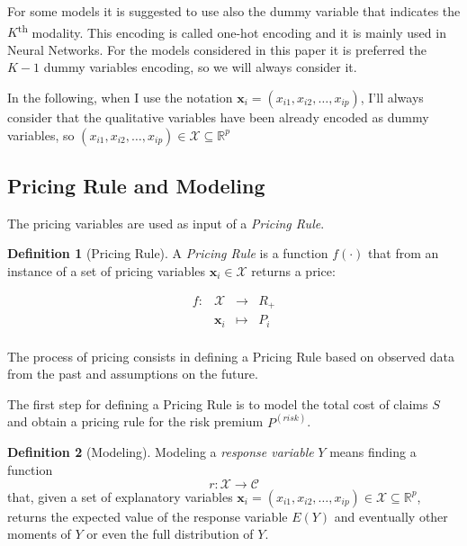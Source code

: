 \documentclass[a4paper, nobind]{templates/ociamthesis}
\theoremstyle{definition}
\newtheorem{definition}{Definition}[chapter]
\theoremstyle{definition}
\theoremstyle{definition}
\theoremstyle{remark}
\begin{document}
For some models it is suggested to use also the dummy variable that indicates the \(K\)\textsuperscript{th} modality. This encoding is called one-hot encoding and it is mainly used in Neural Networks. For the models considered in this paper it is preferred the \(K-1\) dummy variables encoding, so we will always consider it.

In the following, when I use the notation \(\boldsymbol{x}_i=(x_{i1}, x_{i2}, \dots, x_{ip})\), I'll always consider that the qualitative variables have been already encoded as dummy variables, so \((x_{i1}, x_{i2}, \dots, x_{ip})\in \mathcal{X} \subseteq \mathbb{R}^p\)

\hypertarget{pricing-rule-and-modeling}{%
\subsection{Pricing Rule and Modeling}\label{pricing-rule-and-modeling}}

The pricing variables are used as input of a \emph{Pricing Rule}.

\begin{definition}[Pricing Rule]
\label{def:pricing-rule} \iffalse (Pricing Rule) \fi{} A \emph{Pricing Rule} is a function \(f(\cdot)\) that from an instance of a set of pricing variables \(\boldsymbol{x}_i\in\mathcal{X}\) returns a price:

\[  
\begin{array}{rccl}
f: & \mathcal{X}      & \longrightarrow  & R_+ \\
   & \boldsymbol{x}_i & \longmapsto      & P_i \\
\end{array}
\]
\end{definition}

The process of pricing consists in defining a Pricing Rule based on observed data from the past and assumptions on the future.

The first step for defining a Pricing Rule is to model the total cost of claims \(S\) and obtain a pricing rule for the risk premium \(P^{(risk)}\).

\begin{definition}[Modeling]
\label{def:modeling} \iffalse (Modeling) \fi{} Modeling a \emph{response variable} \(Y\) means finding a function
\[r:\mathcal{X}\rightarrow \mathcal{C}\]
that, given a set of explanatory variables \(\boldsymbol{x}_i=(x_{i1}, x_{i2}, \dots, x_{ip})\in \mathcal{X} \subseteq \mathbb{R}^p\), returns the expected value of the response variable \(E(Y)\) and eventually other moments of \(Y\) or even the full distribution of \(Y\).
\end{definition}
\end{document}

